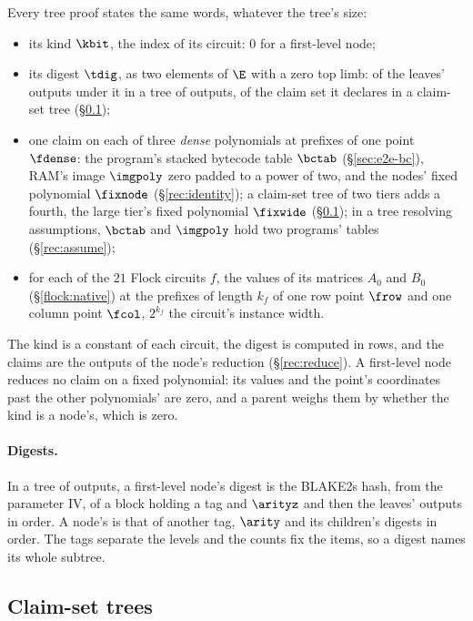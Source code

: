 Every tree proof states the same words, whatever the tree's size:
\begin{itemize}[itemsep=1pt,topsep=3pt]
\item its kind $\kbit$, the index of its circuit: $0$ for a first-level node;
\item its digest $\tdig$, as two elements of $\E$ with a zero top limb: of the leaves' outputs under it in a tree of outputs, of the claim set it declares in a claim-set tree (\S\ref{rec:claimsets});
\item one claim on each of three \emph{dense} polynomials at prefixes of one point $\fdense$: the program's stacked bytecode table $\bctab$ (\S\ref{sec:e2e-bc}), RAM's image $\imgpoly$ zero padded to a power of two, and the nodes' fixed polynomial $\fixnode$ (\S\ref{rec:identity}); a claim-set tree of two tiers adds a fourth, the large tier's fixed polynomial $\fixwide$ (\S\ref{rec:claimsets}); in a tree resolving assumptions, $\bctab$ and $\imgpoly$ hold two programs' tables (\S\ref{rec:assume});
\item for each of the $21$ Flock circuits $f$, the values of its matrices $A_0$ and $B_0$ (\S\ref{flock:native}) at the prefixes of length $k_f$ of one row point $\frow$ and one column point $\fcol$, $2^{k_f}$ the circuit's instance width.
\end{itemize}
The kind is a constant of each circuit, the digest is computed in rows, and the claims are the outputs of the node's reduction (\S\ref{rec:reduce}). A first-level node reduces no claim on a fixed polynomial: its values and the point's coordinates past the other polynomials' are zero, and a parent weighs them by whether the kind is a node's, which is zero.

\paragraph{Digests.} In a tree of outputs, a first-level node's digest is the BLAKE2s hash, from the parameter IV, of a block holding a tag and $\arityz$ and then the leaves' outputs in order. A node's is that of another tag, $\arity$ and its children's digests in order. The tags separate the levels and the counts fix the items, so a digest names its whole subtree.

\subsection{Claim-set trees}\label{rec:claimsets}

